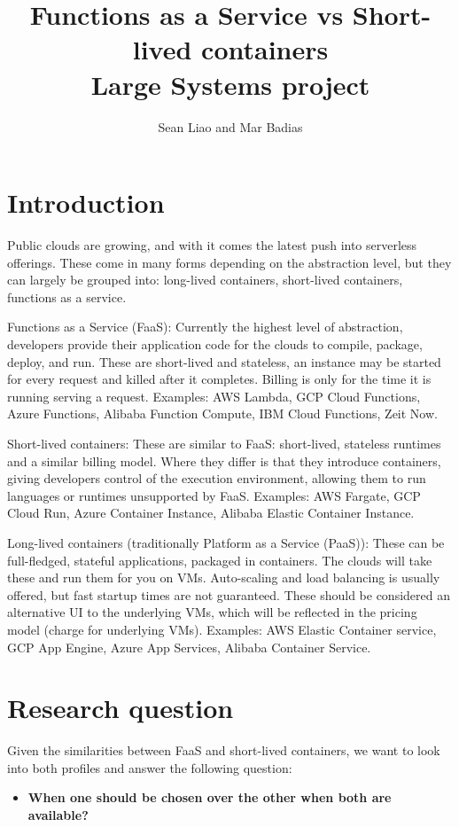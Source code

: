 \documentclass[11pt]{article}
\title{%
  Functions as a Service vs Short-lived containers \\
  \large Large Systems project}
\author{Sean Liao and Mar Badias}
\begin{document}
\maketitle


\section{Introduction}
Public clouds are growing, and with it comes the latest push into serverless offerings. These come in many forms depending on the abstraction level, but they can largely be grouped into: long-lived containers, short-lived containers, functions as a service.

Functions as a Service (FaaS): Currently the highest level of abstraction, developers provide their application code for the clouds to compile, package, deploy, and run. These are short-lived and stateless, an instance may be started for every request and killed after it completes. Billing is only for the time it is running serving a request. Examples: AWS Lambda, GCP Cloud Functions, Azure Functions, Alibaba Function Compute, IBM Cloud Functions, Zeit Now.

Short-lived containers: These are similar to FaaS: short-lived, stateless runtimes and a similar billing model. Where they differ is that they introduce containers, giving developers control of the execution environment, allowing them to run languages or runtimes unsupported by FaaS. Examples: AWS Fargate, GCP Cloud Run, Azure Container Instance, Alibaba Elastic Container Instance.

Long-lived containers (traditionally Platform as a Service (PaaS)): These can be full-fledged, stateful applications, packaged in containers. The clouds will take these and run them for you on VMs. Auto-scaling and load balancing is usually offered, but fast startup times are not guaranteed. These should be considered an alternative UI to the underlying VMs, which will be reflected in the pricing model (charge for underlying VMs). Examples: AWS Elastic Container service, GCP App Engine, Azure App Services, Alibaba Container Service.


\section{Research question}
Given the similarities between FaaS and short-lived containers, we want to look into both profiles and answer the following question:

\begin{itemize}
\item \textbf{When one should be chosen over the other when both are available?}
\end{itemize}
\end{document}
